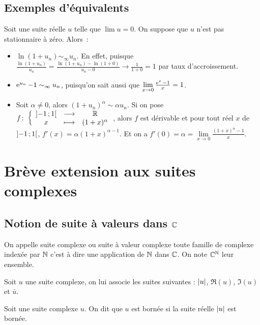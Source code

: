 \subsection{Exemples d'équivalents}

Soit une suite réelle \(u\) telle que \(\lim u = 0\). On suppose que
\(u\) n'est pas stationnaire à zéro. Alors~:
\begin{itemize}
    \item \(\ln(1+u_n) \sim_\infty u_n\). En effet, puisque
        \(\frac{\ln(1+u_n)}{u_n}= \frac{\ln(1+u_n) - \ln(1+0)}{u_n-0} \to
    \frac{1}{1+0} =1\) par taux d'accroissement.  \item \(\operatorname{e}^{u_n}-1
        \sim_\infty u_n\), puisqu'on sait aussi que \(\lim\limits_{x \to
        0} \frac{\operatorname{e}^{x}-1}{x} = 1\).
    \item Soit \(\alpha \neq 0\), alors \((1+u_n)^\alpha \sim \alpha
        u_n\). Si on pose
        \(f\colon\left\{\begin{array}{ccc}\left] -1 \, ; {} 1 \right[ & \longrightarrow &\mathbb{R}\\x & \longmapsto & (1+x)^\alpha\end{array}\right.\), alors
        \(f\) est dérivable et pour tout réel \(x\) de
        \(\left] -1 \, ; {} 1 \right[\), \(f'(x) = \alpha(1+x)^{\alpha -1}\). Et
        on a \(f'(0) = \alpha = \lim\limits_{x \to
        0}\frac{(1+x)^\alpha-1}{x}\).
\end{itemize}

\section{Brève extension aux suites complexes}

\subsection{Notion de suite à valeurs dans \(\mathbb{C}\)}

\begin{defdef}
    On appelle suite complexe ou suite à valeur complexe toute famille
    de complexe indexée par \(\mathbb{N}\) c'est à dire une application de
    \(\mathbb{N}\) dans \(\mathbb{C}\). On note \(\mathbb{C}^{\mathbb{N}}\) leur ensemble.
\end{defdef}
\begin{defdef}
    Soit \(u\) une suite complexe, on lui associe les suites suivantes :
    \(\left\lvert u\right\rvert\), \(\Re(u)\), \(\Im(u)\) et \(\bar{u}\).
\end{defdef}
\begin{defdef}
    Soit une suite complexe \(u\). On dit que \(u\) est bornée si la
    suite réelle \(\left\lvert u\right\rvert\) est bornée.
\end{defdef}

